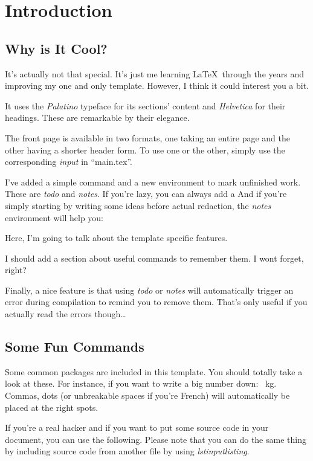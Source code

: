 \section{Introduction}

\subsection{Why is It Cool?}

It's actually not that special. It's just me learning \LaTeX\ through the years and improving my one and only template. However, I think it could interest you a bit.

It uses the \textit{Palatino} typeface for its sections' content and \textit{Helvetica} for their headings. These are remarkable by their elegance.

The front page is available in two formats, one taking an entire page and the other having a shorter header form. To use one or the other, simply use the corresponding \textit{input} in ``main.tex''.

I've added a simple command and a new environment to mark unfinished work. These are \textit{todo} and \textit{notes}. If you're lazy, you can always add a  And if you're simply starting by writing some ideas before actual redaction, the \textit{notes} environment will help you:

\begin{notes}
Here, I'm going to talk about the template specific features.

I should add a section about useful commands to remember them. I wont forget, right?
\end{notes}

Finally, a nice feature is that using \textit{todo} or \textit{notes} will automatically trigger an error during compilation to remind you to remove them. That's only useful if you actually read the errors though\dots

\subsection{Some Fun Commands}

Some common packages are included in this template. You should totally take a look at these. For instance, if you want to write a big number down: ~kg. Commas, dots (or unbreakable spaces if you're French) will automatically be placed at the right spots.

If you're a real hacker and if you want to put some source code in your document, you can use the following. Please note that you can do the same thing by including source code from another file by using \textit{lstinputlisting}.

